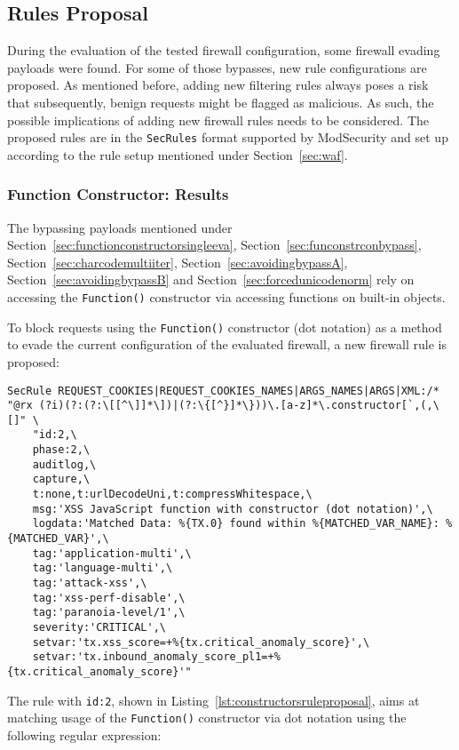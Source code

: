 \subsection{Rules Proposal}
\label{sec:rulesproposal}
During the evaluation of the tested firewall configuration, some firewall evading payloads were found. For some of those bypasses, new rule configurations are proposed. As mentioned before, adding new filtering rules always poses a risk that subsequently, benign requests might be flagged as malicious. As such, the possible implications of adding new firewall rules needs to be considered.
The proposed rules are in the \verb|SecRules| format supported by ModSecurity and set up according to the rule setup mentioned under Section~\ref{sec:waf}.

\subsubsection{Function Constructor: Results}
\label{sec:rulespropfunctionconstructor}
The bypassing payloads mentioned under Section~\ref{sec:functionconstructorsingleeva}, Section~\ref{sec:funconstrconbypass}, Section~\ref{sec:charcodemultiiter}, Section~\ref{sec:avoidingbypassA}, Section~\ref{sec:avoidingbypassB} and Section~\ref{sec:forcedunicodenorm} rely on accessing the \verb|Function()| constructor via accessing functions on built-in objects.

To block requests using the \verb|Function()| constructor (dot notation) as a method to evade the current configuration of the evaluated firewall, a new firewall rule is proposed:

\begin{lstlisting}[style=basicStyle, caption=Rule proposal to block usage of Function() constructor in dot notation, label={lst:constructorsruleproposal}]
SecRule REQUEST_COOKIES|REQUEST_COOKIES_NAMES|ARGS_NAMES|ARGS|XML:/* "@rx (?i)(?:(?:\[[^\]]*\])|(?:\{[^}]*\}))\.[a-z]*\.constructor[`,(,\[]" \
    "id:2,\
    phase:2,\
    auditlog,\
    capture,\
    t:none,t:urlDecodeUni,t:compressWhitespace,\
    msg:'XSS JavaScript function with constructor (dot notation)',\
    logdata:'Matched Data: %{TX.0} found within %{MATCHED_VAR_NAME}: %{MATCHED_VAR}',\
    tag:'application-multi',\
    tag:'language-multi',\
    tag:'attack-xss',\
    tag:'xss-perf-disable',\
    tag:'paranoia-level/1',\
    severity:'CRITICAL',\
    setvar:'tx.xss_score=+%{tx.critical_anomaly_score}',\
    setvar:'tx.inbound_anomaly_score_pl1=+%{tx.critical_anomaly_score}'"
\end{lstlisting}
The rule with \verb|id:2|, shown in Listing~\ref{lst:constructorsruleproposal}, aims at matching usage of the \verb|Function()| constructor via dot notation using the following regular expression:

